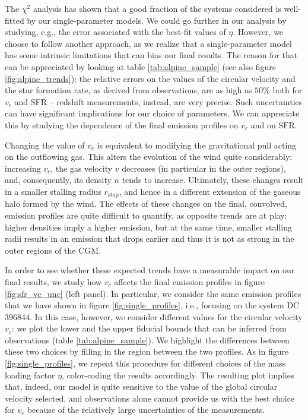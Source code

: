 The $\chi^2$ analysis has shown that a good fraction of the systems considered is well-fitted by our single-parameter models. We could go further in our analysis by studying, e.g., the error associated with the best-fit values of $\eta$. However, we choose to follow another approach, as we realize that a single-parameter model has some intrinsic limitations that can bias our final results.
%
The reason for that can be appreciated by looking at table \ref{tab:alpine_sample} (see also figure \ref{fig:alpine_trends}): the relative errors on the values of the circular velocity and the star formation rate, as derived from observations, are as high as $50 \%$ both for $v_c$ and SFR -- redshift measurements, instead, are very precise.
%
Such uncertainties can have significant implications for our choice of parameters. We can appreciate this by studying the dependence of the final emission profiles on $v_c$ and on $\mathrm{SFR}$. 

Changing the value of $v_c$ is equivalent to modifying the gravitational pull acting on the outflowing gas. This alters the evolution of the wind quite considerably: increasing $v_c$, the gas velocity $v$ decreases (in particular in the outer regions), and, consequently, its density $n$ tends to increase. Ultimately, these changes result in a smaller stalling radius $r_\mathrm{stop}$, and hence in a different extension of the gaseous halo formed by the wind.
%
The effects of these changes on the final, convolved, \CII emission profiles are quite difficult to quantify, as opposite trends are at play: higher densities imply a higher \CII emission, but at the same time, smaller stalling radii results in an emission that drops earlier and thus it is not as strong in the outer regions of the CGM.

In order to see whether these expected trends have a measurable impact on our final results, we study how $v_c$ affects the final \CII emission profiles in figure \ref{fig:sfr_vc_unc} (left panel). In particular, we consider the same \CII emission profiles that we have shown in figure \ref{fig:single_profiles}, i.e., focusing on the system DC$396844$.
%
In this case, however, we consider different values for the circular velocity $v_c$: we plot the lower and the upper fiducial bounds that can be inferred from observations (table \ref{tab:alpine_sample}). We highlight the differences between these two choices by filling in the region between the two profiles. As in figure \ref{fig:single_profiles}, we repeat this procedure for different choices of the mass loading factor $\eta$, color-coding the results accordingly. The resulting plot implies that, indeed, our model is quite sensitive to the value of the global circular velocity selected, and observations alone cannot provide us with the best choice for $v_c$ because of the relatively large uncertainties of the measurements. 

